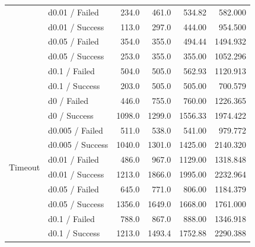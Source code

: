 \begin{table}[htbp]
\begin{tabular}{llrrrr}
		& d0.01 / Failed
		& 234.0 & 461.0 & 534.82 & 582.000 \\
		& d0.01 / Success
		& 113.0 & 297.0 & 444.00 & 954.500 \\

		& d0.05 / Failed
		& 354.0 & 355.0 & 494.44 & 1494.932 \\
		& d0.05 / Success
		& 253.0 & 355.0 & 355.00 & 1052.296 \\

		& d0.1 / Failed
		& 504.0 & 505.0 & 562.93 & 1120.913 \\
		& d0.1 / Success
		& 203.0 & 505.0 & 505.00 & 700.579 \\

		\midrule

		\multirow{10}{*}{Timeout}
		& d0 / Failed
		& 446.0 & 755.0 & 760.00 & 1226.365 \\
		& d0 / Success
		& 1098.0 & 1299.0 & 1556.33 & 1974.422 \\

		& d0.005 / Failed
		& 511.0 & 538.0 & 541.00 & 979.772 \\
		& d0.005 / Success
		& 1040.0 & 1301.0 & 1425.00 & 2140.320 \\

		& d0.01 / Failed
		& 486.0 & 967.0 & 1129.00 & 1318.848 \\
		& d0.01 / Success
		& 1213.0 & 1866.0 & 1995.00 & 2232.964 \\

		& d0.05 / Failed
		& 645.0 & 771.0 & 806.00 & 1184.379 \\
		& d0.05 / Success
		& 1356.0 & 1649.0 & 1668.00 & 1761.000 \\

		& d0.1 / Failed
		& 788.0 & 867.0 & 888.00 & 1346.918 \\
		& d0.1 / Success
		& 1213.0 & 1493.4 & 1752.88 & 2290.388 \\

		\bottomrule
	\end{tabular}
\end{table}
